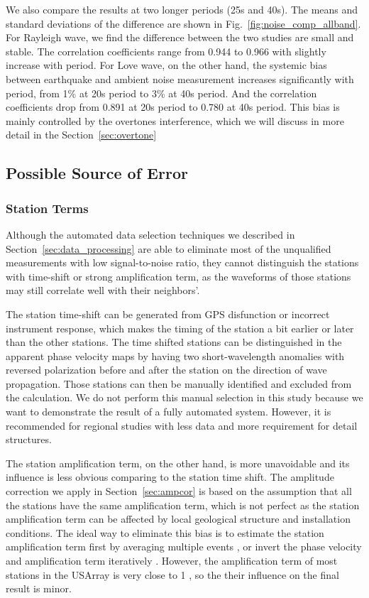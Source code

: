 \documentclass[referee]{gji}
\begin{document}
We also compare the results at two longer periods (25s and 40s). The means and standard deviations of the difference are shown in Fig.~\ref{fig:noise_comp_allband}. For Rayleigh wave, we find the difference between the two studies are small and stable. The correlation coefficients range from 0.944 to 0.966 with slightly increase with period. For Love wave, on the other hand, the systemic bias between earthquake and ambient noise measurement increases significantly with period, from 1\% at 20s period to 3\% at 40s period. And the correlation coefficients drop from 0.891 at 20s period to 0.780 at 40s period. This bias is mainly controlled by the overtones interference, which we will discuss in more detail in the Section~\ref{sec:overtone}

\subsection{Possible Source of Error}

\subsubsection{Station Terms}

Although the automated data selection techniques we described in Section~\ref{sec:data_processing} are able to eliminate most of the unqualified measurements with low signal-to-noise ratio, they cannot distinguish the stations with time-shift or strong amplification term, as the waveforms of those stations may still correlate well with their neighbors’. 

The station time-shift can be generated from GPS disfunction or incorrect instrument response, which makes the timing of the station a bit earlier or later than the other stations. The time shifted stations can be distinguished in the apparent phase velocity maps by having two short-wavelength anomalies with reversed polarization before and after the station on the direction of wave propagation. Those stations can then be manually identified and excluded from the calculation. We do not perform this manual selection in this study because we want to demonstrate the result of a fully automated system. However, it is recommended for regional studies with less data and more requirement for detail structures.

The station amplification term, on the other hand, is more unavoidable and its influence is less obvious comparing to the station time shift.  The amplitude correction we apply in Section~\ref{sec:ampcor} is based on the assumption that all the stations have the same amplification term, which is not perfect as the station amplification term can be affected by local geological structure and installation conditions. The ideal way to eliminate this bias is to estimate the station amplification term first by averaging multiple events \cite{Eddy:2013la}, or invert the phase velocity and amplification term iteratively \cite{Lin:2012la}. However, the amplification term of most stations in the USArray is very close to 1 \cite{Eddy:2013la}, so the their influence on the final result is minor.
\end{document}
